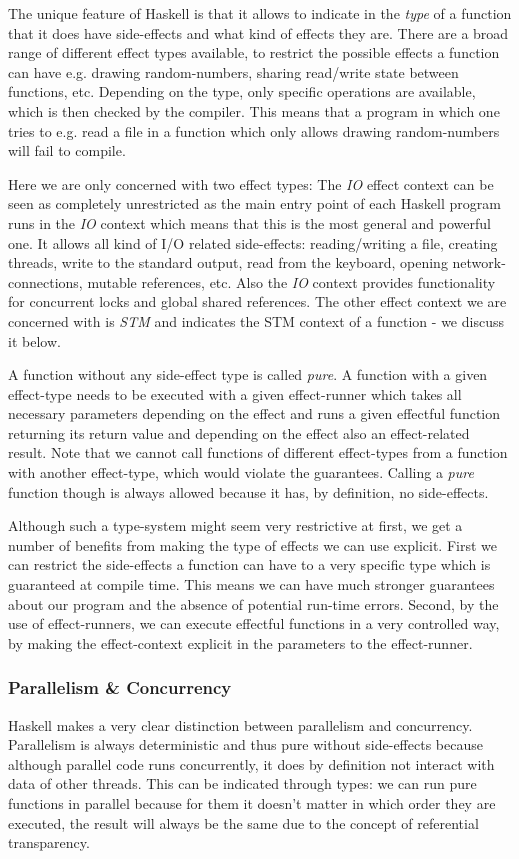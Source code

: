The unique feature of Haskell is that it allows to indicate in the \textit{type} of a function that it does have side-effects and what kind of effects they are. There are a broad range of different effect types available, to restrict the possible effects a function can have e.g. drawing random-numbers, sharing read/write state between functions, etc. Depending on the type, only specific operations are available, which is then checked by the compiler. This means that a program in which one tries to e.g. read a file in a function which only allows drawing random-numbers will fail to compile.

Here we are only concerned with two effect types: The \textit{IO} effect context can be seen as completely unrestricted as the main entry point of each Haskell program runs in the \textit{IO} context which means that this is the most general and powerful one. It allows all kind of I/O related side-effects: reading/writing a file, creating threads, write to the standard output, read from the keyboard, opening network-connections, mutable references, etc. Also the \textit{IO} context provides functionality for concurrent locks and global shared references. The other effect context we are concerned with is \textit{STM} and indicates the STM context of a function - we discuss it below. 

A function without any side-effect type is called \textit{pure}. A function with a given effect-type needs to be executed with a given effect-runner which takes all necessary parameters depending on the effect and runs a given effectful function returning its return value and depending on the effect also an effect-related result. Note that we cannot call functions of different effect-types from a function with another effect-type, which would violate the guarantees. Calling a \textit{pure} function though is always allowed because it has, by definition, no side-effects. 

Although such a type-system might seem very restrictive at first, we get a number of benefits from making the type of effects we can use explicit. First we can restrict the side-effects a function can have to a very specific type which is guaranteed at compile time. This means we can have much stronger guarantees about our program and the absence of potential run-time errors. Second, by the use of effect-runners, we can execute effectful functions in a very controlled way, by making the effect-context explicit in the parameters to the effect-runner.

\subsubsection{Parallelism \& Concurrency}
Haskell makes a very clear distinction between parallelism and concurrency. Parallelism is always deterministic and thus pure without side-effects because although parallel code runs concurrently, it does by definition not interact with data of other threads. This can be indicated through types: we can run pure functions in parallel because for them it doesn't matter in which order they are executed, the result will always be the same due to the concept of referential transparency.

